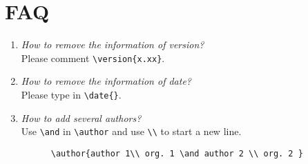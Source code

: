 \documentclass[en,hazy,screen,blue,14pt]{elegantnote}
\begin{document}
\section{FAQ}

\begin{enumerate}[label=\arabic*).]
	\item \textit{How to remove the information of version?}\\
    Please comment \lstinline|\version{x.xx}|.
	\item \textit{How to remove the information of date?}\\
	  Please type in \lstinline|\date{}|.
	\item \textit{How to add several authors?}\\
	  Use \lstinline{\and} in \lstinline{\author} and use \lstinline{\\} to start a new line.
    \begin{lstlisting}
      \author{author 1\\ org. 1 \and author 2 \\ org. 2 }
    \end{lstlisting}
\end{enumerate}


\end{document}
